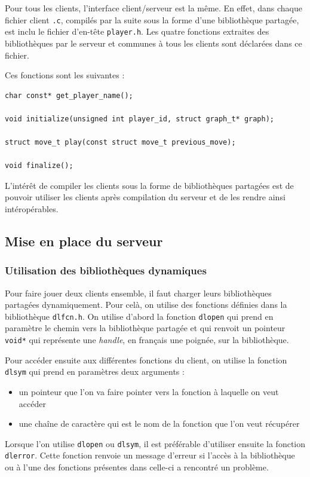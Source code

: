 Pour tous les clients, l'interface client/serveur est la même. En effet, dans chaque fichier client \texttt{.c}, compilés par la suite sous la forme d'une bibliothèque partagée, est inclu le fichier d'en-tête \texttt{player.h}. Les quatre fonctions extraites des bibliothèques par le serveur et communes à tous les clients sont déclarées dans ce fichier.

Ces fonctions sont les suivantes :
\begin{lstlisting}[style=customc, label={lst:playerprim}, caption={Primitives du fichier player.h}]
 char const* get_player_name();

void initialize(unsigned int player_id, struct graph_t* graph);

struct move_t play(const struct move_t previous_move);

void finalize();
  \end{lstlisting}

L'intérêt de compiler les clients sous la forme de bibliothèques partagées est de pouvoir utiliser les clients après compilation du serveur et de les rendre ainsi intéropérables.

\subsection{Mise en place du serveur}

\subsubsection*{Utilisation des bibliothèques dynamiques}

Pour faire jouer deux clients ensemble, il faut charger leurs bibliothèques partagées dynamiquement.
Pour celà, on utilise des fonctions définies dans la bibliothèque \texttt{dlfcn.h}.
On utilise d'abord la fonction \texttt{dlopen} qui prend en paramètre le chemin vers la bibliothèque partagée et qui renvoit un pointeur \texttt{void*} qui représente une \textit{handle}, en français une poignée, sur la bibliothèque.

Pour accéder ensuite aux différentes fonctions du client, on utilise la fonction \texttt{dlsym} qui prend en paramètres deux arguments :
\begin{itemize}
\item un pointeur que l'on va faire pointer vers la fonction à laquelle on veut accéder
\item une chaîne de caractère qui est le nom de la fonction que l'on veut récupérer
\end{itemize}
Lorsque l'on utilise \texttt{dlopen} ou \texttt{dlsym}, il est préférable d'utiliser ensuite la fonction \texttt{dlerror}. Cette fonction renvoie un message d'erreur si l'accès à la bibliothèque ou à l'une des fonctions présentes dans celle-ci a rencontré un problème.

